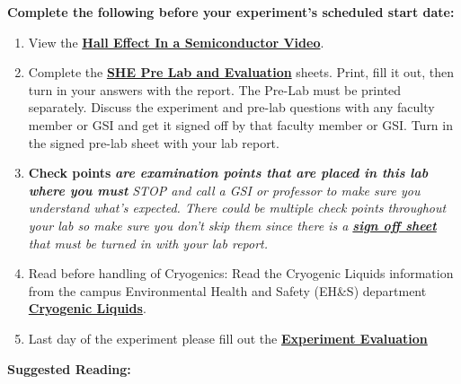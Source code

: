 \documentclass{../lab}
\begin{document}
\textbf{Complete the following before your experiment's scheduled start date:}

\begin{enumerate}
    \item View the \href{http://youtu.be/7JYq1rRl6Xk}{\textbf{Hall Effect In a Semiconductor Video}}.

    \item Complete the \href{http://experimentationlab.berkeley.edu/SHEPreLab}{\textbf{SHE Pre Lab and Evaluation}} sheets. Print, fill it out, then turn in your answers with the report. The Pre-Lab must be printed separately. Discuss the experiment and pre-lab questions with any faculty member or GSI and get it signed off by that faculty member or GSI. Turn in the signed pre-lab sheet with your lab report.

    \item \textbf{Check points} \emph{\textbf{are examination points that are placed in this lab where you must }}\emph{STOP and call a GSI or professor to make sure you understand what's expected. There could  be multiple check points throughout your lab so make sure you don't skip them since there is a \href{http://experimentationlab.berkeley.edu/shecheckpoints}{\textbf{sign off sheet}} that must be turned in with your lab report. }

    \item Read before handling of Cryogenics: Read the Cryogenic Liquids information from the campus Environmental Health and Safety (EH\&S) department \href{http://experimentationlab.berkeley.edu/sites/default/files/images/77cryogenic.pdf}{\textbf{Cryogenic Liquids}}.

    \item Last day of the experiment please fill out the \href{\ExperimentEvaluation}{\textbf{Experiment Evaluation}}

\end{enumerate}

\noindent\textbf{Suggested Reading:}
\end{document}
